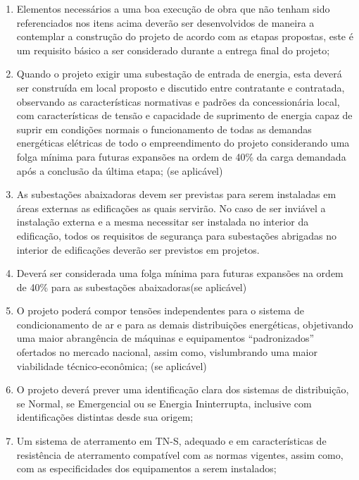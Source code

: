 \begin{enumerate}
	\item Elementos necessários a uma boa execução de obra que não tenham sido referenciados nos itens acima deverão ser desenvolvidos de maneira a contemplar a construção do projeto de acordo com as etapas propostas, este é um requisito básico a ser considerado durante a entrega final do projeto;
	
	\item Quando o projeto exigir uma subestação de entrada de energia, esta deverá ser construída em local proposto e discutido entre contratante e contratada, observando as características normativas e padrões da concessionária local, com características de tensão e capacidade de suprimento de energia capaz de suprir em condições normais o funcionamento de todas as demandas energéticas elétricas de todo o empreendimento do projeto considerando uma folga mínima para futuras expansões na ordem de 40\% da carga demandada após a conclusão da última etapa; (se aplicável)
	
	\item As subestações abaixadoras devem ser previstas para serem instaladas em áreas externas as edificações as quais servirão. No caso de ser inviável a instalação externa e a mesma necessitar ser instalada no interior da edificação, todos os requisitos de segurança para subestações abrigadas no interior de edificações deverão ser previstos em projetos.
	
	\item Deverá ser considerada uma folga mínima para futuras expansões na ordem de 40\% para as subestações abaixadoras(se aplicável)
	
	\item O projeto poderá compor tensões independentes para o sistema de condicionamento de ar e para as demais distribuições energéticas, objetivando uma maior abrangência de máquinas e equipamentos “padronizados” ofertados no mercado nacional, assim como, vislumbrando uma maior viabilidade técnico-econômica; (se aplicável)
	
	\item O projeto deverá prever uma identificação clara dos sistemas de distribuição, se Normal, se Emergencial ou se Energia Ininterrupta, inclusive com identificações distintas desde sua origem;
	
	\item Um sistema de aterramento em TN-S, adequado e em características de resistência de aterramento compatível com as normas vigentes, assim como, com as especificidades dos equipamentos a serem instalados;
	

\end{enumerate}
